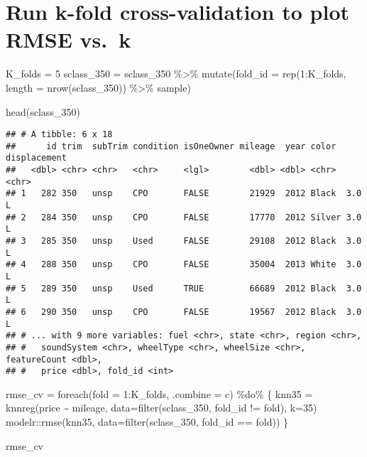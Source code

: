 \documentclass[
]{article}
\newenvironment{Shaded}{\begin{snugshade}}{\end{snugshade}}
\newcommand{\AttributeTok}[1]{\textcolor[rgb]{0.77,0.63,0.00}{#1}}
\newcommand{\DecValTok}[1]{\textcolor[rgb]{0.00,0.00,0.81}{#1}}
\newcommand{\FunctionTok}[1]{\textcolor[rgb]{0.00,0.00,0.00}{#1}}
\newcommand{\NormalTok}[1]{#1}
\newcommand{\OtherTok}[1]{\textcolor[rgb]{0.56,0.35,0.01}{#1}}
\newcommand{\SpecialCharTok}[1]{\textcolor[rgb]{0.00,0.00,0.00}{#1}}
\newcommand{\StringTok}[1]{\textcolor[rgb]{0.31,0.60,0.02}{#1}}
\begin{document}
\hypertarget{run-k-fold-cross-validation-to-plot-rmse-vs.-k}{%
\section{Run k-fold cross-validation to plot RMSE
vs.~k}\label{run-k-fold-cross-validation-to-plot-rmse-vs.-k}}

\begin{Shaded}
\begin{Highlighting}[]
\NormalTok{K\_folds }\OtherTok{=} \DecValTok{5}
\NormalTok{sclass\_350 }\OtherTok{=}\NormalTok{ sclass\_350 }\SpecialCharTok{\%\textgreater{}\%}
  \FunctionTok{mutate}\NormalTok{(}\AttributeTok{fold\_id =} \FunctionTok{rep}\NormalTok{(}\DecValTok{1}\SpecialCharTok{:}\NormalTok{K\_folds, }\AttributeTok{length =} \FunctionTok{nrow}\NormalTok{(sclass\_350)) }\SpecialCharTok{\%\textgreater{}\%}\NormalTok{ sample)}

\FunctionTok{head}\NormalTok{(sclass\_350)}
\end{Highlighting}
\end{Shaded}

\begin{verbatim}
## # A tibble: 6 x 18
##      id trim  subTrim condition isOneOwner mileage  year color  displacement
##   <dbl> <chr> <chr>   <chr>     <lgl>        <dbl> <dbl> <chr>  <chr>       
## 1   282 350   unsp    CPO       FALSE        21929  2012 Black  3.0 L       
## 2   284 350   unsp    CPO       FALSE        17770  2012 Silver 3.0 L       
## 3   285 350   unsp    Used      FALSE        29108  2012 Black  3.0 L       
## 4   288 350   unsp    CPO       FALSE        35004  2013 White  3.0 L       
## 5   289 350   unsp    Used      TRUE         66689  2012 Black  3.0 L       
## 6   290 350   unsp    CPO       FALSE        19567  2012 Black  3.0 L       
## # ... with 9 more variables: fuel <chr>, state <chr>, region <chr>,
## #   soundSystem <chr>, wheelType <chr>, wheelSize <chr>, featureCount <dbl>,
## #   price <dbl>, fold_id <int>
\end{verbatim}

\begin{Shaded}
\begin{Highlighting}[]
\NormalTok{rmse\_cv }\OtherTok{=} \FunctionTok{foreach}\NormalTok{(}\AttributeTok{fold =} \DecValTok{1}\SpecialCharTok{:}\NormalTok{K\_folds, }\AttributeTok{.combine =} \StringTok{\textquotesingle{}c\textquotesingle{}}\NormalTok{) }\SpecialCharTok{\%do\%}\NormalTok{ \{}
\NormalTok{  knn35 }\OtherTok{=} \FunctionTok{knnreg}\NormalTok{(price }\SpecialCharTok{\textasciitilde{}}\NormalTok{ mileage, }\AttributeTok{data=}\FunctionTok{filter}\NormalTok{(sclass\_350, fold\_id }\SpecialCharTok{!=}\NormalTok{ fold), }\AttributeTok{k=}\DecValTok{35}\NormalTok{)}
\NormalTok{  modelr}\SpecialCharTok{::}\FunctionTok{rmse}\NormalTok{(knn35, }\AttributeTok{data=}\FunctionTok{filter}\NormalTok{(sclass\_350, fold\_id }\SpecialCharTok{==}\NormalTok{ fold))}
\NormalTok{\}}

\NormalTok{rmse\_cv}
\end{Highlighting}
\end{Shaded}
\end{document}
